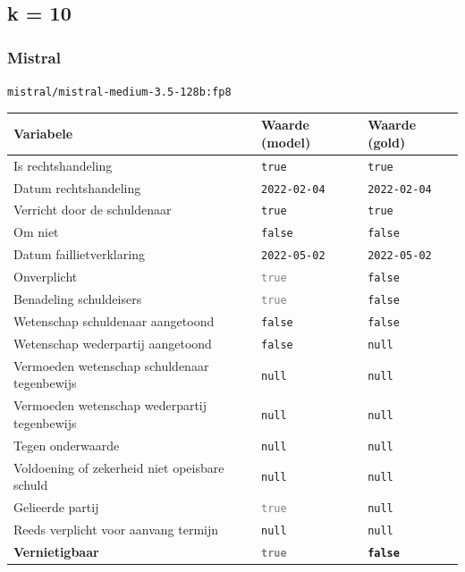 \documentclass[
  dutch,
  a4paper,
]{article}
\begin{document}
\newpage


\subsection{k = 10}\label{k-10-1}

\subsubsection{Mistral}\label{mistral-5}

\texttt{mistral/mistral-medium-3.5-128b:fp8}

\begin{center}
\small
\begin{tabular}{@{}p{7.4cm}p{2.6cm}p{2.6cm}@{}}
\toprule
Variabele & Waarde (model) & Waarde (gold) \\
\midrule
Is rechtshandeling & \texttt{true} & \texttt{true} \\
Datum rechtshandeling & \texttt{2022-02-04} & \texttt{2022-02-04} \\
Verricht door de schuldenaar & \texttt{true} & \texttt{true} \\
Om niet & \texttt{false} & \texttt{false} \\
Datum faillietverklaring & \texttt{2022-05-02} & \texttt{2022-05-02} \\
Onverplicht & \textcolor{gray}{\texttt{true}} & \texttt{false} \\
Benadeling schuldeisers & \textcolor{gray}{\texttt{true}} & \texttt{false} \\
Wetenschap schuldenaar aangetoond & \texttt{false} & \texttt{false} \\
Wetenschap wederpartij aangetoond & \texttt{false} & \texttt{null} \\
Vermoeden wetenschap schuldenaar tegenbewijs & \texttt{null} & \texttt{null} \\
Vermoeden wetenschap wederpartij tegenbewijs & \texttt{null} & \texttt{null} \\
Tegen onderwaarde & \texttt{null} & \texttt{null} \\
Voldoening of zekerheid niet opeisbare schuld & \texttt{null} & \texttt{null} \\
Gelieerde partij & \textcolor{gray}{\texttt{true}} & \texttt{null} \\
Reeds verplicht voor aanvang termijn & \texttt{null} & \texttt{null} \\
\textbf{Vernietigbaar} & \textbf{\textcolor{gray}{\texttt{true}}} & \textbf{\texttt{false}} \\
\bottomrule
\end{tabular}
\end{center}
\end{document}
